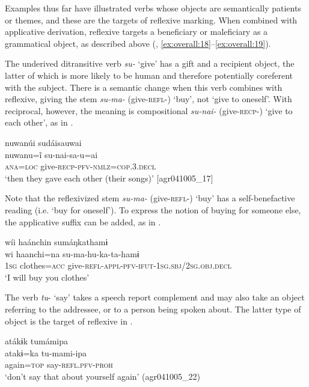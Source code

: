 \documentclass[output=paper]{langscibook}
\begin{document}
Examples thus far have illustrated verbs whose objects are semantically patients or themes, and these are the targets of reflexive marking.
When combined with applicative derivation, reflexive targets a beneficiary or maleficiary as a grammatical object, as described above
(, \ref{ex:overall:18}--\ref{ex:overall:19}).

The underived ditransitive verb \textit{su-} ‘give’ has a gift and a recipient object, the latter of which is
more likely to be human and therefore potentially coreferent with the subject. There is a semantic change when this verb combines with reflexive, giving the stem
\textit{su-ma-} (give-\textsc{refl}\nobreakdash-) ‘buy’, not ‘give to oneself’. With reciprocal, however, the meaning is compositional \textit{su-nai-} (give-\textsc{recp}{}-) ‘give to each other’, as in .

\ea%
    \label{ex:overall:30}
    \glll nuwanúi sudáisauwai\\
  nuwanu=ĩ  su-nai-sa-u=ai\\
  \textsc{ana=loc}  give-\textsc{recp-pfv-nmlz=cop.3.decl}\\
  \glt  ‘then they gave each other (their songs)’ [agr041005\_17]
\z

Note that the reflexivized stem \textit{su-ma-} (give-\textsc{refl-)} ‘buy’ has a self-benefactive reading (i.e. ‘buy for oneself’). To express the notion of buying for someone else, the applicative suffix can be added, as in .

\ea%
    \label{ex:overall:31}
    \glll wíi haánchin sumáŋkathamɨ\\
  wi  haanchi=na  su-ma-hu-ka-ta-hamɨ\\
  1\textsc{sg}  clothes=\textsc{acc}  give-\textsc{refl-appl-pfv-ifut-1sg.sbj/2sg.obj.decl}\\
  \glt  ‘I will buy you clothes’ \citep[309]{Overall2017}
  \z

The verb \textit{tu}{}- ‘say’ takes a speech report complement and may also take an object referring to the addressee, or to a person being spoken about. The latter type of object is the target of reflexive in .

\ea%
    \label{ex:overall:32}
    \glll atákɨk tumámipa\\
  atakɨ=ka  tu-mami-ipa\\
  again=\textsc{top}  say-\textsc{refl.pfv-proh}\\
  \glt  ‘don’t say that about yourself again’ (agr041005\_22)
\z
\end{document}

